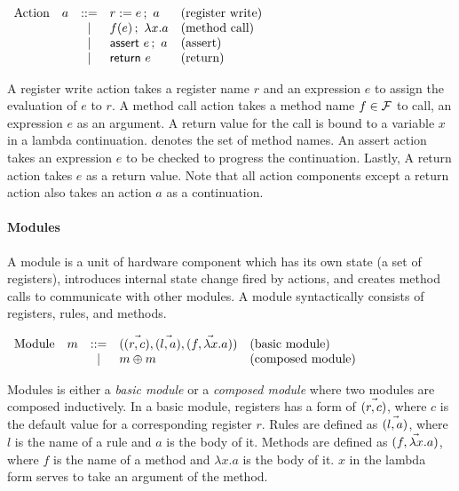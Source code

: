 \begin{center}
  \begin{math}
    \begin{array}{rcll}
      \textrm{Action}\quad a & ::= & \actwrite{r}{e}{a} & \textrm{(register write)} \\
      & | & \actcall{x}{f}{e}{a} & \textrm{(method call)} \\
      & | & \actassert{e}{a} & \textrm{(assert)} \\
      & | & \actret{e} & \textrm{(return)} \\
    \end{array}
  \end{math}
\end{center}

A register write action takes a register name $r$ and an expression
$e$ to assign the evaluation of $e$ to $r$. A method call action takes
a method name $f \in \setmeths{}$ to call, an expression $e$ as an
argument. A return value for the call is bound to a variable $x$ in a
lambda continuation. \setmeths{} denotes the set of method names. An
assert action takes an expression $e$ to be checked to progress the
continuation. Lastly, A return action takes $e$ as a return
value. Note that all action components except a return action also
takes an action $a$ as a continuation.

\paragraph{Modules}
A module is a unit of hardware component which has its own state (a
set of registers), introduces internal state change fired by actions,
and creates method calls to communicate with other modules. A module
syntactically consists of registers, rules, and methods.

\begin{center}
  \begin{math}
    \begin{array}{rcll}
      \textrm{Module}\quad m & ::=
      & \modbasic{\regpair{r}{c}}{\rulepair{l}{a}}{\methodpair{f}{\lambda x.a}}
      & \textrm{(basic module)} \\
      & | & \modcomp{m}{m} & \textrm{(composed module)}
    \end{array}
  \end{math}
\end{center}

Modules is either a \emph{basic module} or a \emph{composed module}
where two modules are composed inductively. In a basic module,
registers has a form of $\listof{\regpair{r}{c}}$, where $c$ is the
default value for a corresponding register $r$. Rules are defined as
$\listof{\rulepair{l}{a}}$, where $l$ is the name of a rule and $a$ is
the body of it. Methods are defined as $\listof{\methodpair{f}{\lambda
    x.a}}$, where $f$ is the name of a method and $\lambda x.a$ is the
body of it. $x$ in the lambda form serves to take an argument of the
method.

